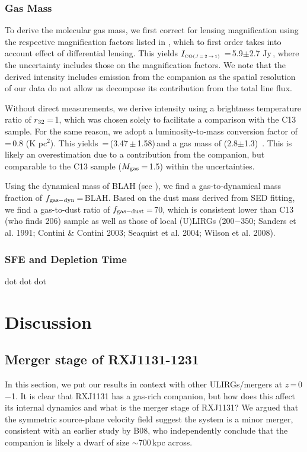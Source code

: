 \documentclass[]{emulateapj}
\begin{document}
\subsubsection{Gas Mass}
To derive the molecular gas mass, we first correct for lensing magnification
using the respective magnification factors listed in , which to
first order takes into account effect of differential lensing. This yields
$I_{\tiny \mbox{CO($J$\,=\,2\,$\rightarrow$\,1) }}$\,=\,5.9$\pm$2.7 Jy\,\kms, where the uncertainty includes those on
the magnification factors.
We note that the derived intensity includes emission from the companion
as the spatial resolution of our data do not allow us decompose its contribution
from the total line flux.

Without direct  measurements,
we derive  intensity
using a brightness temperature ratio of $r_{\rm 32}$\,=\,1, which was chosen
solely to facilitate a comparison with the C13 sample. For the same reason, we
adopt a luminosity-to-mass conversion factor of
\alphaco\,=\,0.8 (K \kms pc$^2$)\pmOne. This yields
\Lp\,=\,(3.47\,$\pm$\,1.58)\,\Lsun and a gas mass
of (2.8$\pm$1.3)\, \Msun. This is likely
an overestimation due to a contribution from the companion, but
comparable to the C13 sample ($M_{\rm gas}$\,=\,1.5\Msun) within the
uncertainties.

Using the dynamical mass of BLAH (see ), we find
a gas-to-dynamical mass fraction of $f_{\rm gas-dyn}$\,=\,BLAH.
Based on the dust mass derived from SED fitting, we find a gas-to-dust ratio of
$f_{\rm gas-dust}$\,=\,70, which is consistent lower than C13
(who finds 206) sample as well as those of local (U)LIRGs
(200$-$350; Sanders et al. 1991; Contini \& Contini 2003; Seaquist et al. 2004; Wilson et al. 2008).

\subsubsection{SFE and Depletion Time}
dot dot dot


\section{Discussion}
\subsection{Merger stage of RXJ1131-1231}
In this section, we put our results in context with other ULIRGs/mergers at
$z$\,=\,0$-$1. It is clear that RXJ1131 has a gas-rich companion, but how does
this affect its internal dynamics and what is the merger stage of RXJ1131?
We argued that the symmetric source-plane velocity field suggest
the system is a minor merger, consistent with an earlier study by B08, who
independently conclude that the companion is likely
a dwarf of size $\sim$700\,kpc across.
\end{document}
